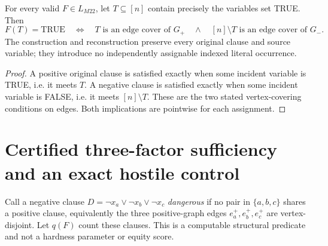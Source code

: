\documentclass[11pt]{article}
\begin{document}
\begin{lemma}\label{dual}
For every valid $F\in L_{M22}$, let $T\subseteq[n]$ contain precisely the variables set TRUE. Then
\[
 F(T)=\mathrm{TRUE}\quad\Longleftrightarrow\quad
 T\text{ is an edge cover of }G_+\quad\land\quad
 [n]\setminus T\text{ is an edge cover of }G_-.
\]
The construction and reconstruction preserve every original clause and source variable; they introduce no independently assignable indexed literal occurrence.
\end{lemma}
\begin{proof}
A positive original clause is satisfied exactly when some incident variable is TRUE, i.e. it meets $T$. A negative clause is satisfied exactly when some incident variable is FALSE, i.e. it meets $[n]\setminus T$. These are the two stated vertex-covering conditions on edges. Both implications are pointwise for each assignment.\end{proof}

\section{Certified three-factor sufficiency and an exact hostile control}
Call a negative clause $D=\neg x_a\vee\neg x_b\vee\neg x_c$ \emph{dangerous} if no pair in $\{a,b,c\}$ shares a positive clause, equivalently the three positive-graph edges $e_a^+,e_b^+,e_c^+$ are vertex-disjoint. Let $q(F)$ count these clauses. This is a computable structural predicate and not a hardness parameter or equity score.
\end{document}
